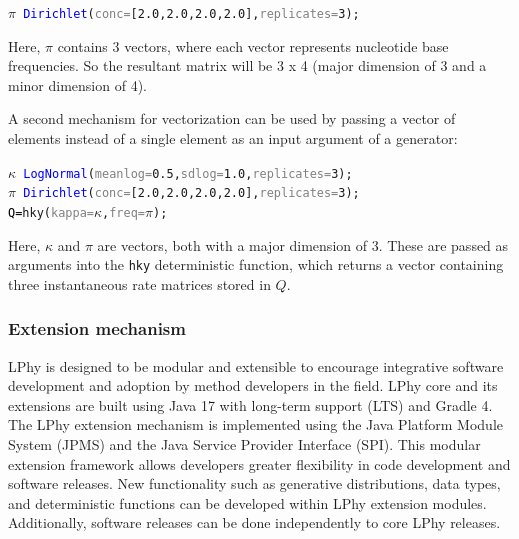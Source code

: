 \documentclass[10pt,letterpaper,table]{article}
\theoremstyle{definition}
\begin{document}
{\small
\begin{alltt}
      \textcolor{bluishgreen}{\(\pi\)} ~ \textcolor{blue}{Dirichlet}(\textcolor{gray}{conc=}[\textcolor{constant}{2.0}, \textcolor{constant}{2.0}, \textcolor{constant}{2.0}, \textcolor{constant}{2.0}], \textcolor{gray}{replicates=}\textcolor{constant}{3});
\end{alltt}
}
Here, $\pi$ contains 3 vectors, where each vector represents nucleotide base frequencies. 
So the resultant matrix will be 3 x 4 (major dimension of 3 and a minor dimension of 4). 

A second mechanism for vectorization can be used by passing a vector of elements instead of a single element as an input argument of a generator:

{\small
\begin{alltt}
    \textcolor{bluishgreen}{\(\kappa\)} ~ \textcolor{blue}{LogNormal}(\textcolor{gray}{meanlog=}\textcolor{constant}{0.5}, \textcolor{gray}{sdlog=}\textcolor{constant}{1.0}, \textcolor{gray}{replicates=}\textcolor{constant}{3});
    \textcolor{bluishgreen}{\(\pi\)} ~ \textcolor{blue}{Dirichlet}(\textcolor{gray}{conc=}[\textcolor{constant}{2.0}, \textcolor{constant}{2.0}, \textcolor{constant}{2.0}, \textcolor{constant}{2.0}], \textcolor{gray}{replicates=}\textcolor{constant}{3});
    \textcolor{black}{Q = }\textcolor{generator}{hky}(\textcolor{gray}{kappa=}\textcolor{bluishgreen}{\(\kappa\)}, \textcolor{gray}{freq=}\textcolor{bluishgreen}{\(\pi\)});
\end{alltt} 
}

Here, $\kappa$ and $\pi$ are vectors, both with a major dimension of 3. 
These are passed as arguments into the \texttt{hky} deterministic function, which returns a vector containing three instantaneous rate matrices stored in $Q$.

\subsubsection{Extension mechanism}
LPhy is designed to be modular and extensible to encourage integrative software development and adoption by method developers in the field. 
LPhy core and its extensions are built using Java 17 with long-term support (LTS) and Gradle 4. 
The LPhy extension mechanism is implemented using the Java Platform Module System (JPMS) and the Java Service Provider Interface (SPI).
This modular extension framework allows developers greater flexibility in code development and software releases. 
New functionality such as generative distributions, data types, and deterministic functions can be developed within LPhy extension modules. 
Additionally, software releases can be done independently to core LPhy releases. 
\end{document}
